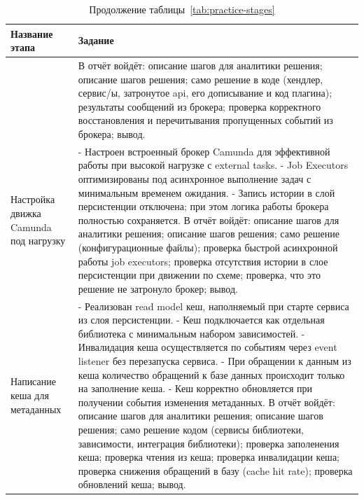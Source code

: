 \newpage
\begin{table}[h]
  \centering
  \caption*{Продолжение таблицы~\ref{tab:practice-stages}}
  \renewcommand{\arraystretch}{1.2}
  \begin{tabularx}{\textwidth}{|>{\raggedright\arraybackslash}p{}|>{\raggedright\arraybackslash}X|}
    \hline
    \textbf{Название этапа} & \textbf{Задание} \\
    \hline
    & В отчёт войдёт: описание шагов для аналитики решения; описание шагов решения; само решение в коде (хендлер, сервис/ы, затронутое api, его дописывание и код плагина); результаты сообщений из брокера; проверка корректного восстановления и перечитывания пропущенных событий из брокера; вывод. \\
    \hline
    Настройка движка Camunda под нагрузку & - Настроен встроенный брокер Camunda для эффективной работы при высокой нагрузке с external tasks. - Job Executors оптимизированы под асинхронное выполнение задач с минимальным временем ожидания. - Запись истории в слой персистенции отключена; при этом логика работы брокера полностью сохраняется. В отчёт войдёт: описание шагов для аналитики решения; описание шагов решения; само решение (конфигурационные файлы); проверка быстрой асинхронной работы job executors; проверка отсутствия истории в слое персистенции при движении по схеме; проверка, что это решение не затронуло брокер; вывод. \\
    \hline
    Написание кеша для метаданных & - Реализован read model кеш, наполняемый при старте сервиса из слоя персистенции. - Кеш подключается как отдельная библиотека с минимальным набором зависимостей. - Инвалидация кеша осуществляется по событиям через event listener без перезапуска сервиса. - При обращении к данным из кеша количество обращений к базе данных происходит только на заполнение кеша. - Кеш корректно обновляется при получении события изменения метаданных. В отчёт войдёт: описание шагов для аналитики решения; описание шагов решения; само решение кодом (сервисы библиотеки, зависимости, интеграция библиотеки); проверка заполенения кеша; проверка чтения из кеша; проверка инвалидации кеша; проверка снижения обращений в базу (cache hit rate); проверка обновлений кеша; вывод. \\
    \hline
  \end{tabularx}
\end{table}

